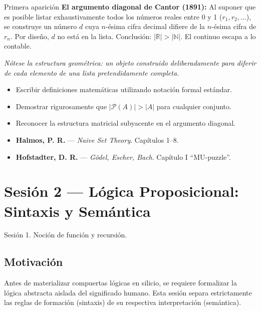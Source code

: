 \documentclass[11pt, letterpaper]{article}
\begin{document}
\begin{diagonal}{Primera aparici\'on}
\textbf{El argumento diagonal de Cantor (1891):} Al suponer que es posible listar exhaustivamente todos los n\'umeros reales entre 0 y 1 ($r_1, r_2, \ldots$), se construye un n\'umero $d$ cuya $n$-\'esima cifra decimal difiere de la $n$-\'esima cifra de $r_n$. Por dise\~no, $d$ no est\'a en la lista. Conclusi\'on: $|\mathbb{R}|>|\mathbb{N}|$. El continuo escapa a lo contable.

\medskip
\textit{N\'otese la estructura geom\'etrica: un objeto construido deliberadamente para diferir de cada elemento de una lista pretendidamente completa.}
\end{diagonal}

\begin{objetivos}
\begin{itemize}
  \item Escribir definiciones matem\'aticas utilizando notaci\'on formal est\'andar.
  \item Demostrar rigurosamente que $|\mathcal{P}(A)|>|A|$ para cualquier conjunto.
  \item Reconocer la estructura matricial subyacente en el argumento diagonal.
\end{itemize}
\end{objetivos}

\begin{lecturas}
\begin{itemize}
  \item[$(\star)$] \textbf{Halmos, P. R.} --- \emph{Naive Set Theory}. Cap\'itulos 1--8.
  \item[$(\star)$] \textbf{Hofstadter, D. R.} --- \emph{G\"odel, Escher, Bach}. Cap\'itulo I ``MU-puzzle''.
\end{itemize}
\end{lecturas}

\newpage

\section{Sesi\'on 2 --- L\'ogica Proposicional: Sintaxis y Sem\'antica}

\begin{prereqs}
Sesi\'on 1. Noci\'on de funci\'on y recursi\'on.
\end{prereqs}

\subsection*{Motivaci\'on}
Antes de materializar compuertas l\'ogicas en silicio, se requiere formalizar la l\'ogica abstracta aislada del significado humano. Esta sesi\'on separa estrictamente las reglas de formaci\'on (sintaxis) de su respectiva interpretaci\'on (sem\'antica).
\end{document}
